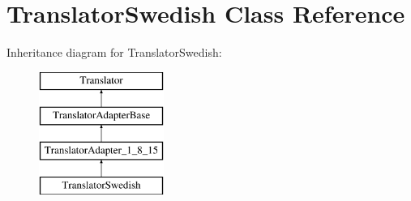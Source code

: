 \hypertarget{class_translator_swedish}{}\section{Translator\+Swedish Class Reference}
\label{class_translator_swedish}
Inheritance diagram for Translator\+Swedish\+:\begin{figure}[H]
\begin{center}
\leavevmode
\includegraphics[height=4.000000cm]{class_translator_swedish}
\end{center}
\end{figure}
